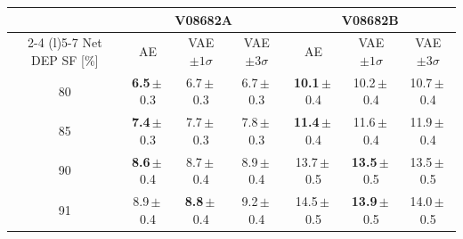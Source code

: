 \begin{table}[H]
    \centering
    \small
    \setlength{\tabcolsep}{4pt}
    \begin{tabular}{ccccccc}
        \toprule
        & \multicolumn{3}{c}{V08682A} & \multicolumn{3}{c}{V08682B} \\
        \cmidrule(lr){2-4} \cmidrule(l){5-7}
        Net \acs{DEP} SF [\%] & \acs{AE} & \acs{VAE} $\pm1\sigma$ & \acs{VAE} $\pm3\sigma$ & \acs{AE} & \acs{VAE} $\pm1\sigma$ & \acs{VAE} $\pm3\sigma$ \\
        \midrule
        80 & \textbf{6.5}\,$\pm$\,0.3 & 6.7\,$\pm$\,0.3 & 6.7\,$\pm$\,0.3 & \textbf{10.1}\,$\pm$\,0.4 & 10.2\,$\pm$\,0.4 & 10.7\,$\pm$\,0.4 \\
        85 & \textbf{7.4}\,$\pm$\,0.3 & 7.7\,$\pm$\,0.3 & 7.8\,$\pm$\,0.3 & \textbf{11.4}\,$\pm$\,0.4 & 11.6\,$\pm$\,0.4 & 11.9\,$\pm$\,0.4 \\
        90 & \textbf{8.6}\,$\pm$\,0.4 & 8.7\,$\pm$\,0.4 & 8.9\,$\pm$\,0.4 & 13.7\,$\pm$\,0.5 & \textbf{13.5}\,$\pm$\,0.5 & 13.5\,$\pm$\,0.5 \\
        91 & 8.9\,$\pm$\,0.4 & \textbf{8.8}\,$\pm$\,0.4 & 9.2\,$\pm$\,0.4 & 14.5\,$\pm$\,0.5 & \textbf{13.9}\,$\pm$\,0.5 & 14.0\,$\pm$\,0.5 \\

\end{tabular}
\end{table}

